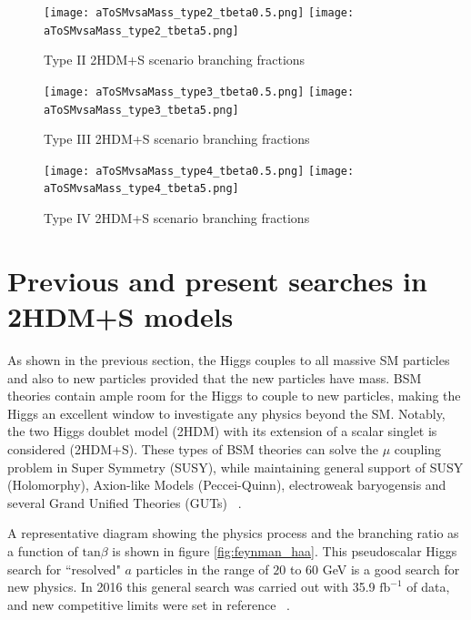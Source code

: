 \begin{figure}[ht!b]
  \centering
\texttt{[image: aToSMvsaMass\_type2\_tbeta0.5.png]}
\texttt{[image: aToSMvsaMass\_type2\_tbeta5.png]}           \\
    \caption{\label{fig:br2HDM-2} Type II 2HDM+S scenario branching fractions ~\cite{Branco_2012}}
\end{figure}

\begin{figure}[ht!b]
  \centering
\texttt{[image: aToSMvsaMass\_type3\_tbeta0.5.png]}
\texttt{[image: aToSMvsaMass\_type3\_tbeta5.png]}           \\
    \caption{\label{fig:br2HDM-3} Type III 2HDM+S scenario branching fractions ~\cite{Branco_2012}}
\end{figure}



\begin{figure}[ht!b]
  \centering
\texttt{[image: aToSMvsaMass\_type4\_tbeta0.5.png]}
\texttt{[image: aToSMvsaMass\_type4\_tbeta5.png]}           \\
    \caption{\label{fig:br2HDM-4} Type IV 2HDM+S scenario branching fractions ~\cite{Branco_2012}}
\end{figure}

\section{Previous and present searches in 2HDM+S models}

As shown in the previous section, the Higgs couples to all massive SM particles and also to new particles provided that the new particles have mass.  
BSM theories contain ample room for the Higgs to couple to new particles, making the Higgs an excellent window to investigate any physics beyond the SM.
Notably, the two Higgs doublet model (2HDM) with its extension of a scalar singlet is considered (2HDM+S).
These types of BSM theories can solve the $\mu$ coupling problem in Super Symmetry (SUSY), while maintaining general support of SUSY (Holomorphy), Axion-like Models (Peccei-Quinn), electroweak baryogensis and several Grand Unified Theories (GUTs) ~\cite{Branco_2012}.

A representative diagram showing the physics process and the branching ratio as a function of $\text{tan}\beta$ is shown in figure \ref{fig:feynman_haa}. This pseudoscalar Higgs search for ``resolved" $a$ particles in the range of $20$ to $60$ GeV is a good search for new physics.
In 2016 this general search was carried out with 35.9 $\text{fb}^{-1}$ of data, and new competitive limits were set in reference ~\cite{CMS-HIG-17-029}.


